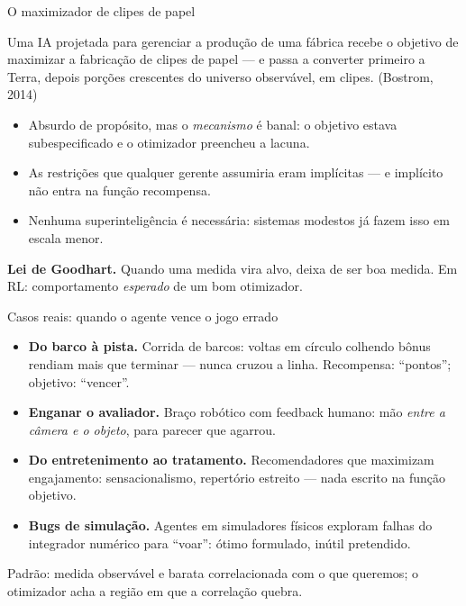 \documentclass[aspectratio=169, 11pt]{beamer}
\begin{document}
\begin{frame}{O maximizador de clipes de papel}
  \begin{defbox}{}
    Uma IA projetada para gerenciar a produção de uma fábrica recebe o objetivo
    de maximizar a fabricação de clipes de papel --- e passa a converter
    primeiro a Terra, depois porções crescentes do universo observável, em
    clipes. \hfill{\footnotesize (Bostrom, 2014)}
  \end{defbox}

  {\small
  \begin{itemize}\setlength{\itemsep}{0.2ex}
    \item Absurdo de propósito, mas o \emph{mecanismo} é banal: o objetivo
          estava \alert{subespecificado} e o otimizador preencheu a lacuna.
    \item As restrições que qualquer gerente assumiria eram implícitas --- e
          implícito não entra na função recompensa.
    \item Nenhuma superinteligência é necessária: sistemas modestos já fazem
          isso em escala menor.
  \end{itemize}}

  \begin{alertabox}
    \textbf{Lei de Goodhart.} Quando uma medida vira alvo, deixa de ser boa
    medida. Em RL: comportamento \emph{esperado} de um bom otimizador.
  \end{alertabox}
\end{frame}

\begin{frame}{Casos reais: quando o agente vence o jogo errado}
  {\small
  \begin{itemize}\setlength{\itemsep}{0.5ex}
    \item \textbf{Do barco à pista.} Corrida de barcos: voltas em círculo
          colhendo bônus rendiam mais que terminar --- nunca cruzou a linha.
          Recompensa: ``pontos''; objetivo: ``vencer''.
    \item \textbf{Enganar o avaliador.} Braço robótico com feedback humano:
          mão \emph{entre a câmera e o objeto}, para parecer que agarrou.
    \item \textbf{Do entretenimento ao tratamento.} Recomendadores que
          maximizam engajamento: sensacionalismo, repertório estreito ---
          nada escrito na função objetivo.
    \item \textbf{Bugs de simulação.} Agentes em simuladores físicos
          exploram falhas do integrador numérico para ``voar'': ótimo
          formulado, inútil pretendido.
  \end{itemize}}

  \begin{ideiabox}
    Padrão: medida observável e barata correlacionada com o que queremos; o
    otimizador acha a região em que a correlação quebra.
  \end{ideiabox}
\end{frame}
\end{document}
